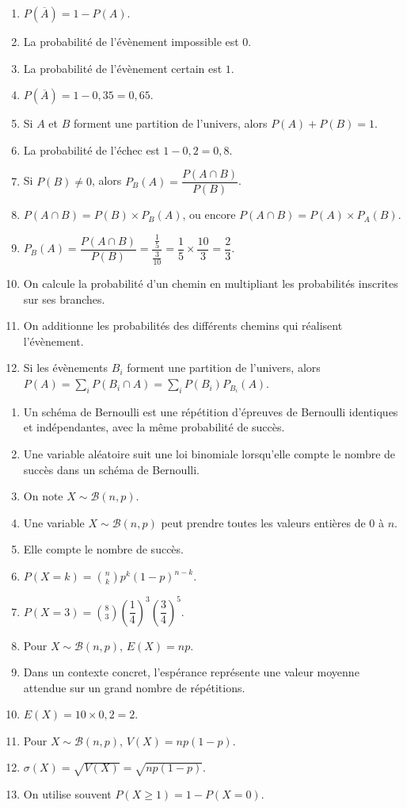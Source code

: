 \documentclass[11pt,a4paper]{article}
\newcounter{reponse}
\newenvironment{blocreponses}[1]{%
  \begin{tcolorbox}[
    enhanced,
    breakable,
    colback=bleuclair,
    colframe=bleufonce,
    boxrule=0.6pt,
    arc=2mm,
    left=2mm,right=2mm,top=2mm,bottom=1.5mm,
    title={\bfseries #1},
    coltitle=white,
    colbacktitle=bleufonce,
    before skip=3mm,
    after skip=3mm, fontupper=\large
  ]
  \large
  \begin{enumerate}[leftmargin=*,label=\textbf{\arabic*.},itemsep=0.45em,topsep=0.5em]
  \setcounter{enumi}{\value{reponse}}
}{%
  \setcounter{reponse}{\value{enumi}}
  \end{enumerate}
  \end{tcolorbox}
}
\begin{document}
\begin{blocreponses}{Réponses -- B. Premiers calculs et arbres de probabilités}
  \item $P(\overline A)=1-P(A)$.
  \item La probabilité de l'évènement impossible est $0$.
  \item La probabilité de l'évènement certain est $1$.
  \item $P(\overline A)=1-0{,}35=0{,}65$.
  \item Si $A$ et $B$ forment une partition de l'univers, alors $P(A)+P(B)=1$.
  \item La probabilité de l'échec est $1-0{,}2=0{,}8$.
  \item Si $P(B)\neq0$, alors $P_B(A)=\dfrac{P(A\cap B)}{P(B)}$.
  \item $P(A\cap B)=P(B)\times P_B(A)$, ou encore $P(A\cap B)=P(A)\times P_A(B)$.
  \item $P_B(A)=\dfrac{P(A\cap B)}{P(B)}=\dfrac{\frac15}{\frac3{10}}=\dfrac15\times\dfrac{10}{3}=\dfrac23$.
  \item On calcule la probabilité d'un chemin en multipliant les probabilités inscrites sur ses branches.
  \item On additionne les probabilités des différents chemins qui réalisent l'évènement.
  \item Si les évènements $B_i$ forment une partition de l'univers, alors $P(A)=\displaystyle\sum_i P(B_i\cap A)=\sum_i P(B_i)P_{B_i}(A)$.
\end{blocreponses}

\begin{blocreponses}{Réponses -- C. Loi binomiale}
  \item Un schéma de Bernoulli est une répétition d'épreuves de Bernoulli identiques et indépendantes, avec la même probabilité de succès.
  \item Une variable aléatoire suit une loi binomiale lorsqu'elle compte le nombre de succès dans un schéma de Bernoulli.
  \item On note $X\sim\mathcal B(n,p)$.
  \item Une variable $X\sim\mathcal B(n,p)$ peut prendre toutes les valeurs entières de $0$ à $n$.
  \item Elle compte le nombre de succès.
  \item $P(X=k)=\binom{n}{k}p^k(1-p)^{n-k}$.
  \item $P(X=3)=\binom83\left(\dfrac14\right)^3\left(\dfrac34\right)^5$.
  \item Pour $X\sim\mathcal B(n,p)$, $E(X)=np$.
  \item Dans un contexte concret, l'espérance représente une valeur moyenne attendue sur un grand nombre de répétitions.
  \item $E(X)=10\times0{,}2=2$.
  \item Pour $X\sim\mathcal B(n,p)$, $V(X)=np(1-p)$.
  \item $\sigma(X)=\sqrt{V(X)}=\sqrt{np(1-p)}$.
  \item On utilise souvent $P(X\geqslant1)=1-P(X=0)$.
\end{blocreponses}
\end{document}
